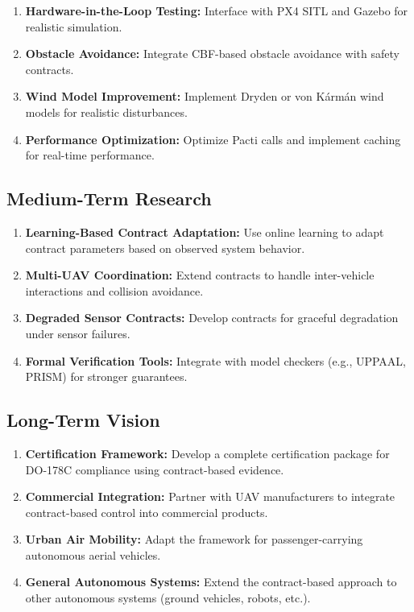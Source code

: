 \begin{enumerate}
    \item \textbf{Hardware-in-the-Loop Testing:}
    Interface with PX4 SITL and Gazebo for realistic simulation.

    \item \textbf{Obstacle Avoidance:}
    Integrate CBF-based obstacle avoidance with safety contracts.

    \item \textbf{Wind Model Improvement:}
    Implement Dryden or von K\'arm\'an wind models for realistic disturbances.

    \item \textbf{Performance Optimization:}
    Optimize Pacti calls and implement caching for real-time performance.
\end{enumerate}

\subsection{Medium-Term Research}

\begin{enumerate}
    \item \textbf{Learning-Based Contract Adaptation:}
    Use online learning to adapt contract parameters based on observed system behavior.

    \item \textbf{Multi-UAV Coordination:}
    Extend contracts to handle inter-vehicle interactions and collision avoidance.

    \item \textbf{Degraded Sensor Contracts:}
    Develop contracts for graceful degradation under sensor failures.

    \item \textbf{Formal Verification Tools:}
    Integrate with model checkers (e.g., UPPAAL, PRISM) for stronger guarantees.
\end{enumerate}

\subsection{Long-Term Vision}

\begin{enumerate}
    \item \textbf{Certification Framework:}
    Develop a complete certification package for DO-178C compliance using contract-based evidence.

    \item \textbf{Commercial Integration:}
    Partner with UAV manufacturers to integrate contract-based control into commercial products.

    \item \textbf{Urban Air Mobility:}
    Adapt the framework for passenger-carrying autonomous aerial vehicles.

    \item \textbf{General Autonomous Systems:}
    Extend the contract-based approach to other autonomous systems (ground vehicles, robots, etc.).
\end{enumerate}

